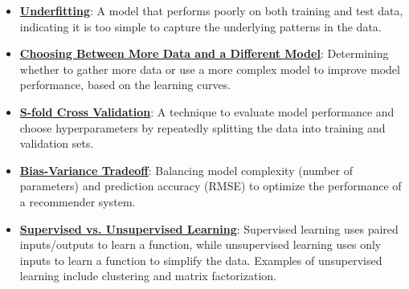 \documentclass{article}%
\begin{document}
\begin{itemize}[leftmargin=*]
\item \href{https://purdue.brightspace.com/d2l/common/assets/pdfjs-d2l-dist/1.0.14-legacy/web/viewer.html?file=\%2Fcontent\%2Fenforced\%2F1095467-wl.202510.CS.24300.001\%2F10L1-CrossValidation.pdf\%3Fou\%3D1095467\&lang=en-us\&container=d2l-fileviewer-rendered-pdf\&fullscreen=d2l-fileviewer-rendered-pdf-dialog\&height=667#page=21}{\textbf{Underfitting}}: A model that performs poorly on both training and test data, indicating it is too simple to capture the underlying patterns in the data.%
\item \href{https://purdue.brightspace.com/d2l/common/assets/pdfjs-d2l-dist/1.0.14-legacy/web/viewer.html?file=\%2Fcontent\%2Fenforced\%2F1095467-wl.202510.CS.24300.001\%2F10L1-CrossValidation.pdf\%3Fou\%3D1095467\&lang=en-us\&container=d2l-fileviewer-rendered-pdf\&fullscreen=d2l-fileviewer-rendered-pdf-dialog\&height=667#page=21}{\textbf{Choosing Between More Data and a Different Model}}: Determining whether to gather more data or use a more complex model to improve model performance, based on the learning curves.%
\item \href{https://purdue.brightspace.com/d2l/common/assets/pdfjs-d2l-dist/1.0.14-legacy/web/viewer.html?file=\%2Fcontent\%2Fenforced\%2F1095467-wl.202510.CS.24300.001\%2F10L1-CrossValidation.pdf\%3Fou\%3D1095467\&lang=en-us\&container=d2l-fileviewer-rendered-pdf\&fullscreen=d2l-fileviewer-rendered-pdf-dialog\&height=667#page=25}{\textbf{S-fold Cross Validation}}: A technique to evaluate model performance and choose hyperparameters by repeatedly splitting the data into training and validation sets.%
\item \href{https://purdue.brightspace.com/d2l/common/assets/pdfjs-d2l-dist/1.0.14-legacy/web/viewer.html?file=\%2Fcontent\%2Fenforced\%2F1095467-wl.202510.CS.24300.001\%2F11L2-svd-pca-recommender.pdf\%3Fou\%3D1095467\&lang=en-us\&container=d2l-fileviewer-rendered-pdf\&fullscreen=d2l-fileviewer-rendered-pdf-dialog\&height=667#page=53}{\textbf{Bias-Variance Tradeoff}}: Balancing model complexity (number of parameters) and prediction accuracy (RMSE) to optimize the performance of a recommender system.%
\item \href{https://purdue.brightspace.com/d2l/common/assets/pdfjs-d2l-dist/1.0.14-legacy/web/viewer.html?file=\%2Fcontent\%2Fenforced\%2F1095467-wl.202510.CS.24300.001\%2F12L2-distance-clusters.pdf\%3Fou\%3D1095467\&lang=en-us\&container=d2l-fileviewer-rendered-pdf\&fullscreen=d2l-fileviewer-rendered-pdf-dialog\&height=667#page=3}{\textbf{Supervised vs. Unsupervised Learning}}: Supervised learning uses paired inputs/outputs to learn a function, while unsupervised learning uses only inputs to learn a function to simplify the data. Examples of unsupervised learning include clustering and matrix factorization.%
\end{itemize}
\end{document}

